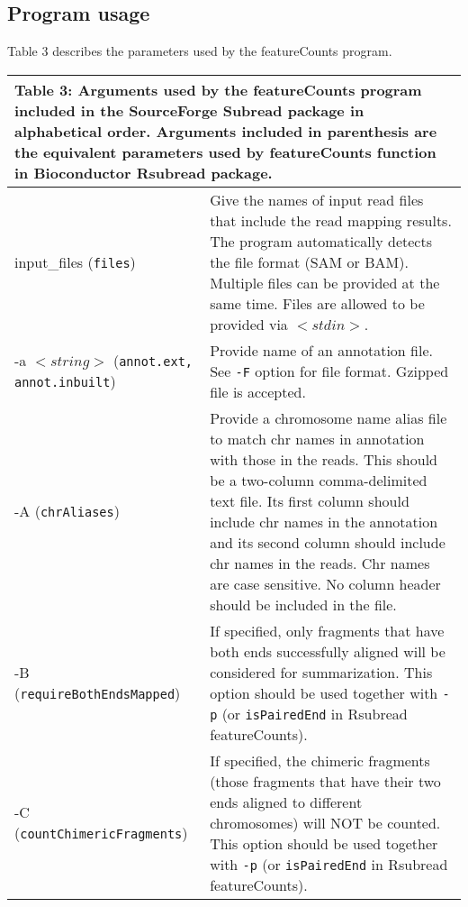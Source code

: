 \documentclass[12pt]{report}
\newcommand{\code}[1]{{\small\texttt{#1}}}
\newcommand{\Subread}{\textsf{Subread}}
\newcommand{\Rsubread}{\textsf{Rsubread}}
\newcommand{\featureCounts}{\textsf{featureCounts}}
\begin{document}
\subsection{Program usage}

Table 3 describes the parameters used by the {\featureCounts} program.

\pagebreak

\begin{longtable}{|p{5cm}|p{11cm}|}
\multicolumn{2}{p{16cm}}{Table 3: Arguments used by the {\featureCounts} program included in the SourceForge {\Subread} package in alphabetical order.
Arguments included in parenthesis are the equivalent parameters used by {\featureCounts} function in Bioconductor {\Rsubread} package.}
\endfirsthead
\hline
Arguments & Description \\
\hline
input\_files \newline (\code{files}) & Give the names of input read files that include the read mapping results. The program automatically detects the file format (SAM or BAM). Multiple files can be provided at the same time. Files are allowed to be provided via $<stdin>$. \\
\hline
-a $<string>$ \newline (\code{annot.ext, annot.inbuilt})  & Provide name of an annotation file. See \code{-F} option for file format. Gzipped file is accepted.\\
\hline
-A \newline (\code{chrAliases}) & Provide a chromosome name alias file to match chr names in annotation with those in the reads. This should be a two-column comma-delimited text file. Its first column should include chr names in the annotation and its second column should include chr names in the reads. Chr names are case sensitive. No column header should be included in the file.\\
\hline
-B \newline (\code{requireBothEndsMapped}) & If specified, only fragments that have both ends successfully aligned will be considered for summarization. This option should be used together with \code{-p} (or \code{isPairedEnd} in {\Rsubread} {\featureCounts}).\\
\hline
-C \newline (\code{countChimericFragments}) & If specified, the chimeric fragments (those fragments that have their two ends aligned to different chromosomes) will NOT be counted. This option should be used together with \code{-p} (or \code{isPairedEnd} in {\Rsubread} {\featureCounts}).\\

\end{longtable}
\end{document}
